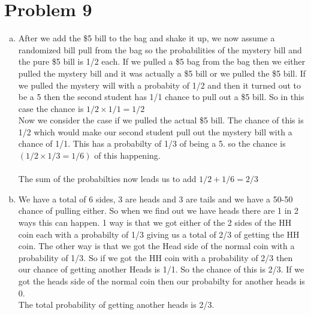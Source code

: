 \documentclass[11pt,letterpaper]{article}
\begin{document}
\section*{Problem 9}
\begin{enumerate}[(a)]
\item
After we add the \$5 bill to the bag and shake it up, we now assume a randomized bill pull from the bag so the probabilities of the mystery bill and the pure \$5 bill is 1/2 each. If we pulled a \$5 bag from the bag then we either pulled the mystery bill and it was actually a \$5 bill or we pulled the \$5 bill. If we pulled the mystery will with a probabity of 1/2 and then it turned out to be a 5 then the second student has 1/1 chance to pull out a \$5 bill. So in this case the chance is $1/2\times 1/1 = 1/2$\\
Now we consider the case if we pulled the actual \$5 bill. The chance of this is 1/2 which would make our second student pull out the mystery bill with a chance of 1/1. This has a probabilty of 1/3 of being a 5. so the chance is $(1/2 \times 1/3 = 1/6)$ of this happening.\\\\
The sum of the probabilties now leads us to add $1/2 + 1/6 = 2/3$
\item
We have a total of 6 sides, 3 are heads and 3 are tails and we have a 50-50 chance of pulling either. So when we find out we have heads there are 1 in 2 ways this can happen. 1 way is that we got either of the 2 sides of the HH coin each with a probabilty of 1/3 giving us a total of 2/3 of getting the HH coin. The other way is that we got the Head side of the normal coin with a probability of 1/3. So if we got the HH coin with a probability of 2/3 then our chance of getting another Heads is 1/1. So the chance of this is 2/3. If we got the heads side of the normal coin then our probabilty for another heads is 0.\\
The total probability of getting another heads is 2/3.
\end{enumerate}
\end{document}
